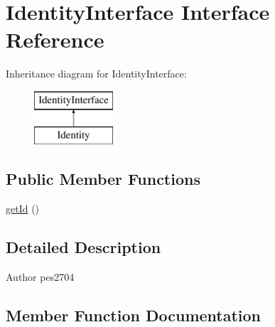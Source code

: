 \hypertarget{interface_pes_1_1_entity_1_1_persistable_1_1_identity_interface}{}\section{Identity\+Interface Interface Reference}
\label{interface_pes_1_1_entity_1_1_persistable_1_1_identity_interface}
Inheritance diagram for Identity\+Interface\+:\begin{figure}[H]
\begin{center}
\leavevmode
\includegraphics[height=2.000000cm]{interface_pes_1_1_entity_1_1_persistable_1_1_identity_interface}
\end{center}
\end{figure}
\subsection*{Public Member Functions}
\begin{DoxyCompactItemize}
\item 
\mbox{\hyperlink{interface_pes_1_1_entity_1_1_persistable_1_1_identity_interface_a12251d0c022e9e21c137a105ff683f13}{get\+Id}} ()
\end{DoxyCompactItemize}


\subsection{Detailed Description}
\begin{DoxyAuthor}{Author}
pes2704 
\end{DoxyAuthor}


\subsection{Member Function Documentation}
\mbox{\label{interface_pes_1_1_entity_1_1_persistable_1_1_identity_interface_a12251d0c022e9e21c137a105ff683f13}} 
